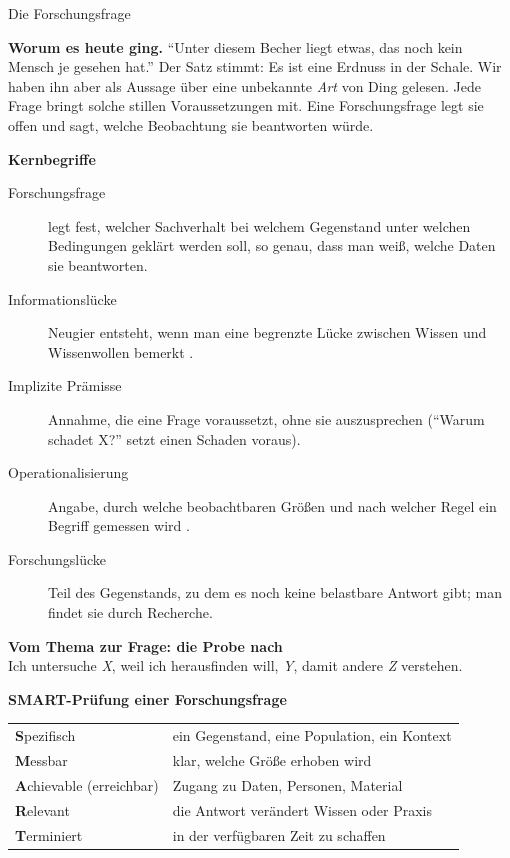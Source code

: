 \begin{handout}{Die Forschungsfrage}

\textbf{Worum es heute ging.} \enquote{Unter diesem Becher liegt etwas, das
noch kein Mensch je gesehen hat.} Der Satz stimmt: Es ist eine Erdnuss in
der Schale. Wir haben ihn aber als Aussage über eine unbekannte \emph{Art}
von Ding gelesen. Jede Frage bringt solche stillen Voraussetzungen mit. Eine
Forschungsfrage legt sie offen und sagt, welche Beobachtung sie beantworten
würde.

\textbf{Kernbegriffe}
\begin{description}
  \item[Forschungsfrage] legt fest, welcher Sachverhalt bei welchem
    Gegenstand unter welchen Bedingungen geklärt werden soll, so genau, dass
    man weiß, welche Daten sie beantworten.
  \item[Informationslücke] Neugier entsteht, wenn man eine begrenzte Lücke
    zwischen Wissen und Wissenwollen bemerkt \parencite{loewenstein1994}.
  \item[Implizite Prämisse] Annahme, die eine Frage voraussetzt, ohne sie
    auszusprechen (\enquote{Warum schadet X?} setzt einen Schaden voraus).
  \item[Operationalisierung] Angabe, durch welche beobachtbaren Größen und
    nach welcher Regel ein Begriff gemessen wird
    \parencite{doering2016forschungsmethoden}.
  \item[Forschungslücke] Teil des Gegenstands, zu dem es noch keine
    belastbare Antwort gibt; man findet sie durch Recherche.
\end{description}

\textbf{Vom Thema zur Frage: die Probe nach \textcite{booth2016craft}}\\
Ich untersuche \emph{X}, weil ich herausfinden will, \emph{Y}, damit andere
\emph{Z} verstehen.

\textbf{SMART-Prüfung einer Forschungsfrage}

\begin{center}
\small
\begin{tabular}{lp{}}
\toprule
\textbf{S}pezifisch & ein Gegenstand, eine Population, ein Kontext \\
\textbf{M}essbar & klar, welche Größe erhoben wird \\
\textbf{A}chievable (erreichbar) & Zugang zu Daten, Personen, Material \\
\textbf{R}elevant & die Antwort verändert Wissen oder Praxis \\
\textbf{T}erminiert & in der verfügbaren Zeit zu schaffen \\
\bottomrule
\end{tabular}
\end{center}


\end{handout}
